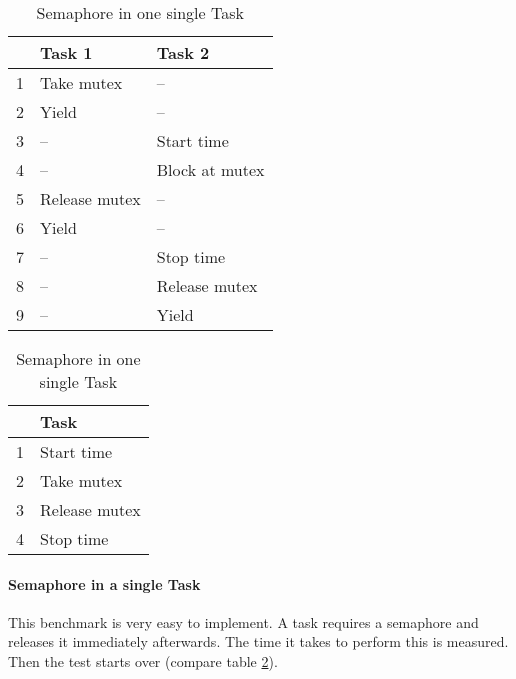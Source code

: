 \begin{table}[htbp]
\begin{minipage}[t]{0.45\textwidth}
	\begin{center}
		\begin{tabular}{|l|l|l|}
			\hline
				& Task 1							& Task 2						\\
				\hline 
			  1 & Take mutex					& --								\\
			  2 & Yield								& --								\\
			  3 & --									& Start time				\\ 
			  4 & --									& Block at mutex		\\
			  5 & Release mutex				& --								\\
			  6 & Yield								& --								\\
			  7 & --									& Stop time					\\ 
			  8 & --									& Release mutex			\\
			  9 & --									& Yield							\\			  
			\hline
		\end{tabular}
	\caption{Semaphore Shuffling Time proposed by Kar}
	\label{tab_sem_kar}
	\end{center}
	\end{minipage} \hfill 
	\begin{minipage}[t]{0.45\textwidth}
	\begin{center}
		\begin{tabular}{|l|l|}
			\hline
				& Task 							\\
				\hline 
				1 & Start time				\\ 
			  2 & Take mutex				\\
				3 & Release mutex			\\						 
			  4 & Stop time					\\ 			  
			\hline
		\end{tabular}
	\caption{Semaphore in one single Task}
	\label{tab_sem_single}
	\end{center}
	\end{minipage}
\end{table}

\paragraph{Semaphore in a single Task}
This benchmark is very easy to implement.
A task requires a semaphore and releases it immediately afterwards.
The time it takes to perform this is measured.
Then the test starts over (compare table \ref{tab_sem_single}).

